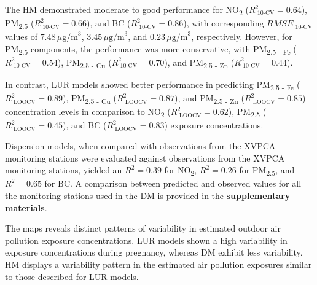 \documentclass{article}
\begin{document}
The HM demonstrated moderate to good performance for NO\textsubscript{2} ($R^{2}_{\text{ 10-CV}} = 0.64$), PM\textsubscript{2.5} ($R^{2}_{\text{ 10-CV}} = 0.66$), and BC ($R^{2}_{\text{ 10-CV}} = 0.86$), with corresponding $RMSE_{\text{ 10-CV}}$ values of $7.48 \, \mu\text{g/m}^{3}$, $3.45 \, \mu\text{g/m}^{3}$, and $0.23 \, \mu\text{g/m}^{3}$, respectively. However, for PM\textsubscript{2.5} components, the performance was more conservative, with PM\textsubscript{2.5 - Fe} ($R^{2}_{\text{ 10-CV}} = 0.54$), PM\textsubscript{2.5 - Cu} ($R^{2}_{\text{ 10-CV}} = 0.70$), and PM\textsubscript{2.5 - Zn} ($R^{2}_{\text{ 10-CV}} = 0.44$).

In contrast, LUR models showed better performance in predicting PM\textsubscript{2.5 - Fe} ($R^{2}_{\text{ LOOCV}} = 0.89$), PM\textsubscript{2.5 - Cu} ($R^{2}_{\text{ LOOCV}} = 0.87$), and PM\textsubscript{2.5 - Zn} ($R^{2}_{\text{ LOOCV}} = 0.85$) concentration levels in comparison to  NO\textsubscript{2} ($R^{2}_{\text{ LOOCV}} = 0.62$), PM\textsubscript{2.5} ($R^{2}_{\text{ LOOCV}} = 0.45$), and BC ($R^{2}_{\text{ LOOCV}} = 0.83$) exposure concentrations. 

Dispersion models, when compared with observations from the XVPCA monitoring stations were evaluated against observations from the XVPCA monitoring stations, yielded an $R^{2} = 0.39$ for NO\textsubscript{2}, $R^{2} = 0.26$ for PM\textsubscript{2.5}, and $R^{2} = 0.65$ for BC. A comparison between predicted and observed values for all the monitoring stations used in the DM is provided in the \textbf{supplementary materials}.

The maps reveals distinct patterns of variability in estimated outdoor air pollution exposure concentrations. LUR models shown a high variability in exposure concentrations during pregnancy, whereas DM exhibit less variability. HM displays a variability pattern in the estimated air pollution exposures similar to those described for LUR models.
\end{document}
